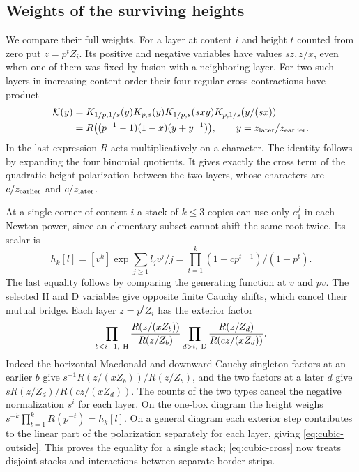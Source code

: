 \subsection{Weights of the surviving heights}
We compare their full weights. For a layer at content $i$ and height
$t$ counted from zero put $z=p^tZ_i$. Its positive and negative
variables have values $sz,z/x$, even when one of them was fixed
by fusion with a neighboring layer. For two such layers in increasing
content order their four regular cross contractions have product
\begin{equation}\label{eq:cubic-cross}
 \begin{split}
 \mathcal K(y)={}&K_{1/p,1/s}(y)K_{p,s}(y)
          K_{1/p,s}(sxy)K_{p,1/s}(y/(sx))\\
       ={}&R\big((p^{-1}-1)(1-x)(y+y^{-1})\big),\qquad
             y=z_{\rm later}/z_{\rm earlier}.
 \end{split}
\end{equation}
In the last expression $R$ acts multiplicatively on a character. The
identity follows by expanding the four binomial quotients. It gives
exactly the cross term of the quadratic height polarization between
the two layers, whose characters are $c/z_{\rm earlier}$ and
$c/z_{\rm later}$.

At a single corner of content $i$ a stack of $k\le3$ copies can use
only $e_1^j$ in each Newton power, since an elementary subset cannot
shift the same root twice. Its scalar is
\[
 h_k[l]=[v^k]\exp\!\sum_{j\ge1} l_j v^j/j
       =\prod_{t=1}^k(1-cp^{t-1})/(1-p^t).
\]
The last equality follows by comparing the generating function at $v$
and $pv$. The selected H and D variables give opposite finite Cauchy
shifts, which cancel their mutual bridge. Each layer $z=p^tZ_i$ has
the exterior factor
\begin{equation}\label{eq:cubic-outside}
 \prod_{b<i-1,\ {\rm H}}\frac{R(z/(xZ_b))}{R(z/Z_b)}
 \prod_{d>i,\ {\rm D}}\frac{R(z/Z_d)}{R(cz/(xZ_d))}.
\end{equation}
Indeed the horizontal Macdonald and downward Cauchy singleton
factors at an earlier $b$ give $s^{-1} R(z/(xZ_b))/R(z/Z_b)$,
and the two factors at a later $d$ give
$sR(z/Z_d)/R(cz/(xZ_d))$. The counts of the two types cancel
the negative normalization $s^i$ for each layer. On the one-box
diagram the height weighs $s^{-k}\prod_{t=1}^k R(p^{-t})=h_k[l]$.
On a general diagram each exterior step contributes to the linear
part of the polarization separately for each layer, giving
\eqref{eq:cubic-outside}. This proves the equality for a single stack;
\eqref{eq:cubic-cross} now treats disjoint stacks and interactions
between separate border strips.


